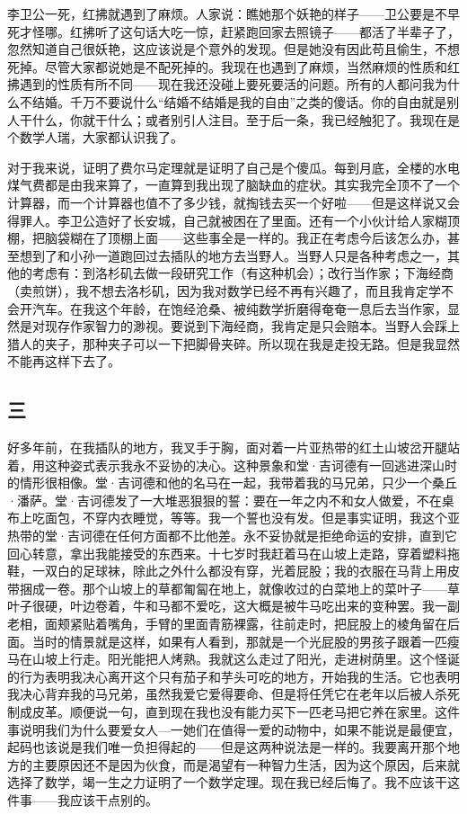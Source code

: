 李卫公一死，红拂就遇到了麻烦。人家说：瞧她那个妖艳的样子——卫公要是不早死才怪哪。红拂听了这句话大吃一惊，赶紧跑回家去照镜子——都活了半辈子了，忽然知道自己很妖艳，这应该说是个意外的发现。但是她没有因此苟且偷生，不想死掉。尽管大家都说她是不配死掉的。我现在也遇到了麻烦，当然麻烦的性质和红拂遇到的性质有所不同——现在我还没碰上要死要活的问题。所有的人都问我为什么不结婚。千万不要说什么“结婚不结婚是我的自由”之类的傻话。你的自由就是别人干什么，你就干什么；或者别引人注目。至于后一条，我已经触犯了。我现在是个数学人瑞，大家都认识我了。 

对于我来说，证明了费尔马定理就是证明了自己是个傻瓜。每到月底，全楼的水电煤气费都是由我来算了，一直算到我出现了脑缺血的症状。其实我完全顶不了一个计算器，而一个计算器也值不了多少钱，就掏钱去买一个好啦——但是这样说又会得罪人。李卫公造好了长安城，自己就被困在了里面。还有一个小伙计给人家糊顶棚，把脑袋糊在了顶棚上面——这些事全是一样的。我正在考虑今后该怎么办，甚至想到了和小孙一道跑回过去插队的地方去当野人。当野人只是各种考虑之一，其他的考虑有：到洛杉矶去做一段研究工作（有这种机会）；改行当作家；下海经商（卖煎饼），我不想去洛杉矶，因为我对数学已经不再有兴趣了，而且我肯定学不会开汽车。在我这个年龄，在饱经沧桑、被纯数学折磨得奄奄一息后去当作家，显然是对现存作家智力的渺视。要说到下海经商，我肯定是只会赔本。当野人会踩上猎人的夹子，那种夹子可以一下把脚骨夹碎。所以现在我是走投无路。但是我显然不能再这样下去了。 

\subsection{三} 

好多年前，在我插队的地方，我叉手于胸，面对着一片亚热带的红土山坡岔开腿站着，用这种姿式表示我永不妥协的决心。这种景象和堂·吉诃德有一回逃进深山时的情形很相像。堂·吉诃德和他的名马在一起，我带着我的马兄弟，只少一个桑丘·潘萨。堂·吉诃德发了一大堆恶狠狠的誓：要在一年之内不和女人做爱，不在桌布上吃面包，不穿内衣睡觉，等等。我一个誓也没有发。但是事实证明，我这个亚热带的堂·吉诃德在任何方面都不比他差。永不妥协就是拒绝命运的安排，直到它回心转意，拿出我能接受的东西来。十七岁时我赶着马在山坡上走路，穿着塑料拖鞋，一双白的足球袜，除此之外什么都没有穿，光着屁股；我的衣服在马背上用皮带捆成一卷。那个山坡上的草都匍匐在地上，就像收过的白菜地上的菜叶子——草叶子很硬，叶边卷着，牛和马都不爱吃，这大概是被牛马吃出来的变种罢。我一副老相，面颊紧贴着嘴角，手臂的里面青筋裸露，往前走时，把屁股上的棱角留在后面。当时的情景就是这样，如果有人看到，那就是一个光屁股的男孩子跟着一匹瘦马在山坡上行走。阳光能把人烤熟。我就这么走过了阳光，走进树荫里。这个怪诞的行为表明我决心离开这个只有茄子和芋头可吃的地方，开始我的生活。它也表明我决心背弃我的马兄弟，虽然我爱它爱得要命、但是将任凭它在老年以后被人杀死制成皮革。顺便说一句，直到现在我也没有能力买下一匹老马把它养在家里。这件事说明我们为什么要爱女人—一她们在值得一爱的动物中，如果不能说是最便宜，起码也该说是我们唯一负担得起的——但是这两种说法是一样的。我要离开那个地方的主要原因还不是因为伙食，而是渴望有一种智力生活，因为这个原因，后来就选择了数学，竭一生之力证明了一个数学定理。现在我已经后悔了。我不应该干这件事——我应该干点别的。 

